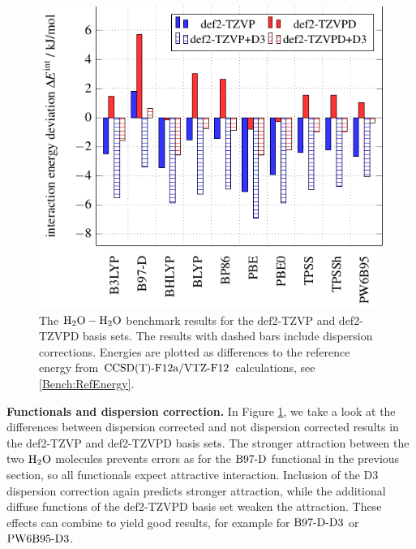 \begin{figure}[b!]
\includegraphics[width=.7\textwidth]{TikzPics/TikzCreation/Bench/BenchH2O+H2O.TZVPCompare.pdf}
\caption{The $\mbox{\ensuremath{\text H _2 \text O-\text H _2 \text O}}$ benchmark results for the def2-TZVP and def2-TZVPD basis sets.
The results with dashed bars include dispersion corrections. Energies are plotted as differences
to the reference energy from $\text{CCSD(T)-F12a}/\text{VTZ-F}12$ calculations, see \eqref{Bench:RefEnergy}.}
\label{Fig:Bench:H2O+H2O:TZVPCompare}
\end{figure}

\textbf{Functionals and dispersion correction.} In Figure
\ref{Fig:Bench:H2O+H2O:TZVPCompare}, we take a look at the differences between dispersion corrected and not dispersion
corrected results in the def2-TZVP and def2-TZVPD basis sets. The stronger
attraction between the two $\text H _2 \text O$ molecules prevents errors as for the
$\text{B97-D}$ functional in the previous section, so all functionals expect attractive
interaction. Inclusion of the D3 dispersion correction again predicts
stronger attraction, while the additional diffuse functions of the def2-TZVPD
basis set weaken the attraction. These effects can combine to yield good
results, for example for $\text{B97-D}\text{-D3}$ or $\text{PW6B95}\text{-D3}$.

